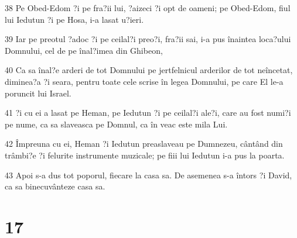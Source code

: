 \par 38 Pe Obed-Edom ?i pe fra?ii lui, ?aizeci ?i opt de oameni; pe Obed-Edom, fiul lui Iedutun ?i pe Hosa, i-a lasat u?ieri.
\par 39 Iar pe preotul ?adoc ?i pe ceilal?i preo?i, fra?ii sai, i-a pus înaintea loca?ului Domnului, cel de pe înal?imea din Ghibeon,
\par 40 Ca sa înal?e arderi de tot Domnului pe jertfelnicul arderilor de tot neîncetat, diminea?a ?i seara, pentru toate cele scrise în legea Domnului, pe care El le-a poruncit lui Israel.
\par 41 ?i cu ei a lasat pe Heman, pe Iedutun ?i pe ceilal?i ale?i, care au fost numi?i pe nume, ca sa slaveasca pe Domnul, ca în veac este mila Lui.
\par 42 Împreuna cu ei, Heman ?i Iedutun preaslaveau pe Dumnezeu, cântând din trâmbi?e ?i felurite instrumente muzicale; pe fiii lui Iedutun i-a pus la poarta.
\par 43 Apoi s-a dus tot poporul, fiecare la casa sa. De asemenea s-a întors ?i David, ca sa binecuvânteze casa sa.

\chapter{17}

